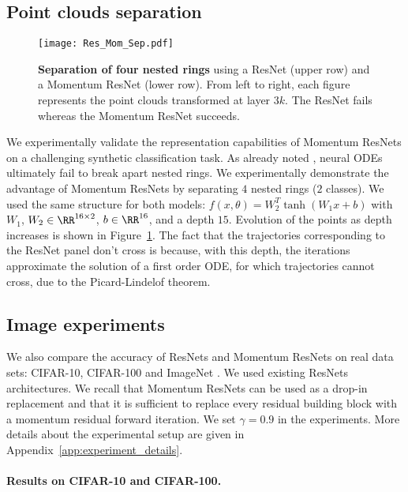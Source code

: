 \documentclass{article}
\begin{document}
\subsection{Point clouds separation}\label{sec:point_clouds}
\begin{figure}[H]
\texttt{[image: Res\_Mom\_Sep.pdf]} 
\caption{\textbf{Separation of four nested rings} using a ResNet (upper row) and a Momentum ResNet (lower row). From left to right, each figure represents the point clouds transformed at layer $3k$. The ResNet fails whereas the Momentum ResNet succeeds.}\label{fig:four_imbricated}
\vspace{-1em}
\end{figure}
We experimentally validate the representation capabilities of Momentum ResNets on a challenging synthetic classification task. 
As already noted \citep{dupont2019augmented}, neural ODEs ultimately fail to break apart nested rings.
We experimentally demonstrate the advantage of Momentum ResNets by separating $4$ nested rings ($2$ classes). We used the same structure for both models: $f(x,\theta) = W_2^{T} \tanh (W_1x +b)$ with $W_1$, $W_2\in \RR^{16 \times 2}$, $b\in \RR^{16}$, and a depth $15$. Evolution of the points as depth increases is shown in Figure~\ref{fig:four_imbricated}.  The fact that the trajectories corresponding to the ResNet panel don't cross is because, with this depth, the iterations approximate the solution of a first order ODE, for which trajectories cannot cross, due to the Picard-Lindelof theorem.

\subsection{Image experiments}\label{sec:experiments_images}


We also compare the accuracy of ResNets and Momentum ResNets on real data sets: CIFAR-10, CIFAR-100 \citep{CIFAR} and  ImageNet \citep{deng2009imagenet}.  We used existing ResNets architectures. We recall that Momentum ResNets can be used as a drop-in replacement and that it is sufficient to replace every residual building block with a momentum residual forward iteration. We set $\gamma = 0.9$ in the experiments. More details about the experimental setup are given in Appendix~\ref{app:experiment_details}.








\paragraph{Results on CIFAR-10 and CIFAR-100.} 
\end{document}
